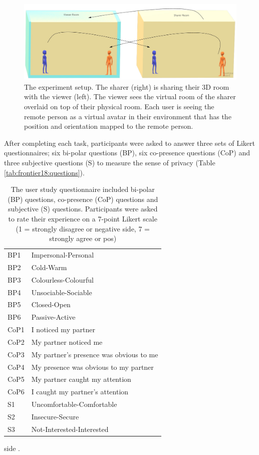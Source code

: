 \begin{figure}[H]
    \begin{center}
    \includegraphics[width=\linewidth]{images/frontier18/experiment-setup.jpg}
    \caption{The experiment setup. The sharer (right) is sharing their 3D room with the viewer (left). The viewer sees the virtual room of the sharer overlaid on top of their physical room. Each user is seeing the remote person as a virtual avatar in their environment that has the position and orientation mapped to the remote person.}\label{fig:frontier18:setup}
    \end{center}
\end{figure}

After completing each task, participants were asked to answer three sets of Likert questionnaires; six bi-polar questions (BP), six co-presence questions (CoP) and three subjective questions (S) to measure the sense of privacy (Table \ref{tab:frontier18:questions}).  

\begin{table}
    \centering
    \begin{tabular}{ll}
BP1 &    Impersonal-Personal\\
BP2 &    Cold-Warm\\
BP3 &    Colourless-Colourful\\
BP4 &    Unsociable-Sociable\\
BP5 &    Closed-Open\\
BP6 &    Passive-Active\\
CoP1    &   I noticed my partner\\
CoP2    &   My partner noticed me\\
CoP3    &   My partner's presence was obvious to me\\
CoP4    &   My presence was obvious to my partner\\
CoP5    &   My partner caught my attention \\
CoP6    &   I caught my partner's attention\\
S1  & Uncomfortable-Comfortable\\
S2  & Insecure-Secure\\
S3  & Not-Interested-Interested\\
    \end{tabular}
    \caption{The user study questionnaire included bi-polar (BP) questions, co-presence (CoP) questions and subjective (S) questions. Participants were asked to rate their experience on a 7-point Likert scale (1 = strongly disagree or negative side, 7 = strongly agree or pos)}
   side . \label{tabitive:frontier18:questions}
\end{table}

